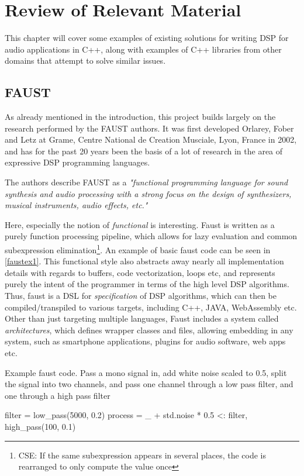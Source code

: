 \chapter{Review of Relevant Material}
\label{chap:related}

This chapter will cover some examples of existing solutions for writing DSP for audio applications in C++,
along with examples of C++ libraries from other domains that attempt to solve similar issues.

\section{FAUST}
As already mentioned in the introduction, this project builds largely on the research performed by the FAUST
authors. It was first developed Orlarey, Fober and Letz at Grame, Centre National de Creation Musciale, Lyon,
France in 2002\autocite{orlarey2002}, and has for the past 20 years been the basis of a lot of research in the
area of expressive DSP programming languages\autocite{letz:hal-02158925, buffa:hal-01721483, dimitrov:hal-02158954, berdahl:hal-03162897}.

The authors describe FAUST as a \emph{"functional programming language for sound synthesis and audio processing with a strong focus on the design
  of synthesizers, musical instruments, audio effects, etc."\autocite{faustwebsite}}

Here, especially the notion of \emph{functional} is interesting. Faust is written as a purely function
processing pipeline, which allows for lazy evaluation and common subexpression
elimination\footnote{CSE: If the same subexpression appears in several places, the code is rearranged to only compute the value once}. An example of basic faust code can be seen in \autoref{faustex1}. This
functional style also abstracts away nearly all implementation details with regards to buffers, code
vectorization, loops etc, and represents purely the intent of the programmer in terms of the high level DSP
algorithms. Thus, faust is a DSL for \emph{specification} of DSP algorithms, which can then be
compiled/transpiled to various targets, including C++, JAVA, WebAssembly etc. Other than just targeting
multiple languages, Faust includes a system called \emph{architectures}, which defines wrapper classes and
files, allowing embedding in any system, such as smartphone applications, plugins for audio software, web
apps etc.

\begin{listing}
  \label{faustex1}
  \caption{ Example faust code. Pass a mono signal in, add white noise scaled to 0.5, split the signal into two channels, and pass one channel through a low pass filter, and one through a high pass filter }
  \begin{cppcodenl}
  filter = low_pass(5000, 0.2)
  process = _ + std.noise * 0.5 <: filter, high_pass(100, 0.1)
  \end{cppcodenl}
\end{listing}

